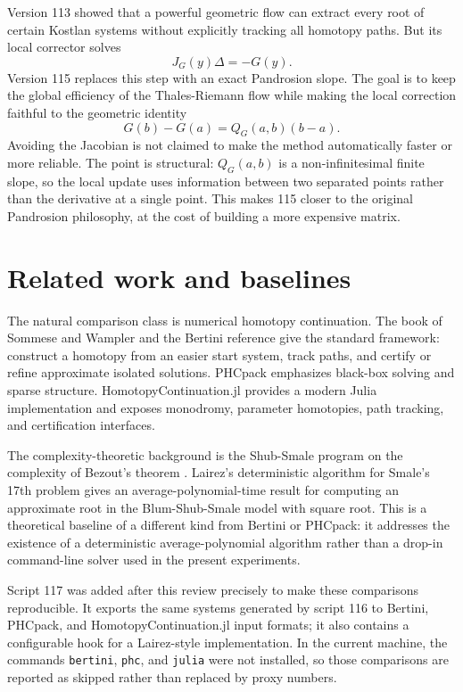 \documentclass[11pt,a4paper]{article}
\begin{document}
Version 113 showed that a powerful geometric flow can extract every root of certain Kostlan systems without explicitly tracking all homotopy paths. But its local corrector solves
\[
  J_G(y)\Delta=-G(y).
\]
Version 115 replaces this step with an exact Pandrosion slope. The goal is to keep the global efficiency of the Thales-Riemann flow while making the local correction faithful to the geometric identity
\[
  G(b)-G(a)=Q_G(a,b)(b-a).
\]
Avoiding the Jacobian is not claimed to make the method automatically faster or more reliable. The point is structural: \(Q_G(a,b)\) is a non-infinitesimal finite slope, so the local update uses information between two separated points rather than the derivative at a single point. This makes 115 closer to the original Pandrosion philosophy, at the cost of building a more expensive matrix.

\section{Related work and baselines}
The natural comparison class is numerical homotopy continuation. The book of Sommese and Wampler \cite{sommese2005numerical} and the Bertini reference \cite{bates2013bertini} give the standard framework: construct a homotopy from an easier start system, track paths, and certify or refine approximate isolated solutions. PHCpack \cite{verschelde1999phcpack} emphasizes black-box solving and sparse structure. HomotopyContinuation.jl \cite{breiding2018hc} provides a modern Julia implementation and exposes monodromy, parameter homotopies, path tracking, and certification interfaces.

The complexity-theoretic background is the Shub-Smale program on the complexity of Bezout's theorem \cite{shubsmale1994bezout}. Lairez's deterministic algorithm for Smale's 17th problem \cite{lairez2017deterministic} gives an average-polynomial-time result for computing an approximate root in the Blum-Shub-Smale model with square root. This is a theoretical baseline of a different kind from Bertini or PHCpack: it addresses the existence of a deterministic average-polynomial algorithm rather than a drop-in command-line solver used in the present experiments.

Script 117 was added after this review precisely to make these comparisons reproducible. It exports the same systems generated by script 116 to Bertini, PHCpack, and HomotopyContinuation.jl input formats; it also contains a configurable hook for a Lairez-style implementation. In the current machine, the commands \texttt{bertini}, \texttt{phc}, and \texttt{julia} were not installed, so those comparisons are reported as skipped rather than replaced by proxy numbers.
\end{document}
